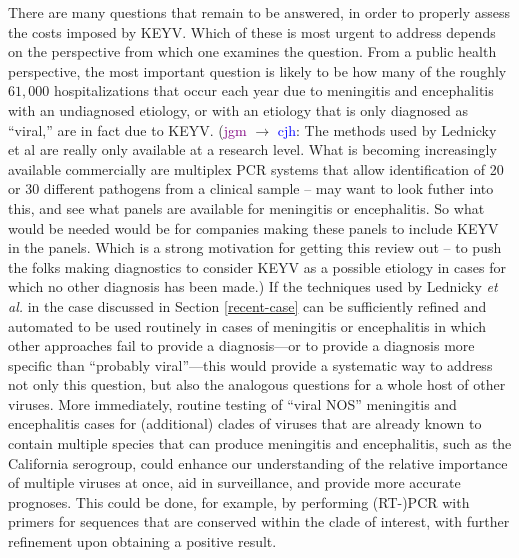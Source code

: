 \documentclass[12pt]{article}
\newcommand{\cjh}{\textcolor{blue}{cjh}}
\newcommand{\jgm}{\textcolor{purple}{jgm}}
\newcommand{\msg}[3]{(#1 $\rightarrow$ #2: #3)}
\newcommand{\mgc}[1]{\msg\jgm\cjh{#1}}
\begin{document}

        There are many questions that remain to be answered, in order to properly assess the costs imposed by KEYV. Which of these is most urgent to address depends on the perspective from which one examines the question. From a public health perspective, the most important question is likely to be how many of the roughly $61,000$ hospitalizations that occur each year due to meningitis and encephalitis with an undiagnosed etiology\cite{holmquist2008meningitis,george2014encephalitis}, or with an etiology that is only diagnosed as ``viral,'' are in fact due to KEYV. \mgc{The methods used by Lednicky et al are really only available at a research level.  What is becoming increasingly available commercially are multiplex PCR systems that allow identification of 20 or 30 different pathogens from a clinical sample – may want to look futher into this, and see what panels are available for meningitis or encephalitis.  So what would be needed would be for companies making these panels to include KEYV in the panels.  Which is a strong motivation for getting this review out – to push the folks making diagnostics to consider KEYV as a possible etiology in cases for which no other diagnosis has been made.} If the techniques used by Lednicky \textit{et al.}\cite{lednicky2018keystone} in the case discussed in Section \ref{recent-case} can be sufficiently refined and automated to be used routinely in cases of meningitis or encephalitis in which other approaches fail to provide a diagnosis---or to provide a diagnosis more specific than ``probably viral''---this would provide a systematic way to address not only this question, but also the analogous questions for a whole host of other viruses. More immediately, routine testing of ``viral NOS'' meningitis and encephalitis cases for (additional) clades of viruses that are already known to contain multiple species that can produce meningitis and encephalitis, such as the California serogroup, could enhance our understanding of the relative importance of multiple viruses at once, aid in surveillance, and provide more accurate prognoses. This could be done, for example, by performing (RT-)PCR with primers for sequences that are conserved within the clade of interest, with further refinement upon obtaining a positive result.
\end{document}
